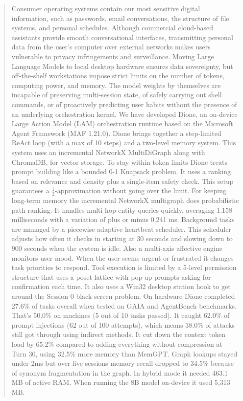 \documentclass[conference,a4paper]{IEEEtran}
\begin{document}
\begin{abstract}
Consumer operating systems contain our most sensitive digital information, such as passwords, email conversations, the structure of file systems, and personal schedules. Although commercial cloud-based assistants provide smooth conversational interfaces, transmitting personal data from the user's computer over external networks makes users vulnerable to privacy infringements and surveillance. Moving Large Language Models to local desktop hardware ensures data sovereignty, but off-the-shelf workstations impose strict limits on the number of tokens, computing power, and memory. The model weights by themselves are incapable of preserving multi-session state, of safely carrying out shell commands, or of proactively predicting user habits without the presence of an underlying orchestration kernel. We have developed Dione, an on-device Large Action Model (LAM) orchestration runtime based on the Microsoft Agent Framework (MAF 1.21.0). Dione brings together a step-limited ReAct loop (with a max of 10 steps) and a two-level memory system. This system uses an incremental NetworkX MultiDiGraph along with ChromaDB, for vector storage. To stay within token limits Dione treats prompt building like a bounded 0-1 Knapsack problem. It uses a ranking based on relevance and density plus a single-item safety check. This setup guarantees a $\frac{1}{2}$-approximation without going over the limit. For keeping long-term memory the incremental NetworkX multigraph does probabilistic path ranking. It handles multi-hop entity queries quickly, averaging 1.158 milliseconds with a variation of plus or minus 0.241 ms. Background tasks are managed by a piecewise adaptive heartbeat scheduler. This scheduler adjusts how often it checks in starting at 30 seconds and slowing down to 900 seconds when the system is idle. Also a multi-axis affective engine monitors user mood. When the user seems urgent or frustrated it changes task priorities to respond. Tool execution is limited by a 5-level permission structure that uses a poset lattice with pop-up prompts asking for confirmation each time. It also uses a Win32 desktop station hook to get around the Session 0 black screen problem. On hardware Dione completed 27.6\% of tasks overall when tested on GAIA and AgentBench benchmarks. That’s 50.0\% on machines (5 out of 10 tasks passed). It caught 62.0\% of prompt injections (62 out of 100 attempts), which means 38.0\% of attacks still got through using indirect methods. It cut down the context token load by 65.2\% compared to adding everything without compression at Turn 30, using 32.5\% more memory than MemGPT. Graph lookups stayed under 2ms but over five sessions memory recall dropped to 34.5\% because of synonym fragmentation in the graph. In hybrid mode it needed 463.1\,MB of active RAM. When running the 8B model on-device it used 5,313\,MB.
\end{abstract}
\end{document}
